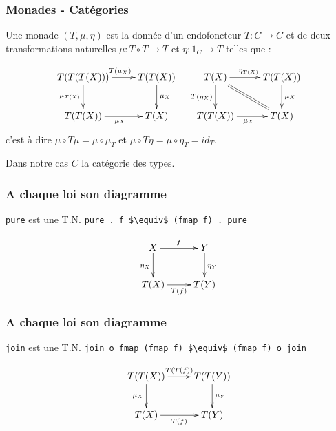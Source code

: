 \documentclass{beamer}
\begin{document}
\begin{frame}
\frametitle{Monades - Catégories}
Une monade $(T, \mu, \eta)$ est la donnée d'un
endofoncteur $T : C \rightarrow C$ et de deux
transformations naturelles $\mu : T\circ T \rightarrow T$ et $\eta : 1_C \rightarrow T$ telles que :

\[
\begin{array}{cc}
\xymatrix{
T(T(T(X))) \ar[r]^{T(\mu_X)} \ar[d]_{\mu_{T(X)}} & T(T(X)) \ar[d]^{\mu_X} \\
T(T(X)) \ar[r]_{\mu_X} & T(X) \\
}
&
\xymatrix{
T(X) \ar[r]^{\eta_{T(X)}} \ar[d]_{T(\eta_X)}  \ar@{=}[dr] & T(T(X)) \ar[d]^{\mu_X} \\
T(T(X)) \ar[r]_{\mu_X} & T(X) \\
}
\end{array}
\]
c'est à dire
$\mu \circ T\mu = \mu \circ \mu_T$
et
$\mu \circ T \eta = \mu \circ \eta_T = id_T$.

\pause
\medskip\medskip
Dans notre cas $C$ la catégorie des types.
\end{frame}

\begin{frame}
\frametitle{A chaque loi son diagramme}
\begin{alertblock}{\verb!pure! est une T.N.}
\verb!pure . f $\equiv$ (fmap f) . pure!
\end{alertblock}

\begin{block}{}
\[
\xymatrix{
X \ar[r]^{f} \ar[d]_{\eta_X} & Y \ar[d]^{\eta_Y} \\
T(X) \ar[r]_{T(f)} & T(Y) \\
}
\]
\end{block}

\end{frame}

\begin{frame}
\frametitle{A chaque loi son diagramme}
\begin{alertblock}{\verb!join! est une T.N.}
\verb!join o fmap (fmap f) $\equiv$ (fmap f) o join!
\end{alertblock}

\begin{block}{}
\[
\xymatrix{
T(T(X)) \ar[r]^{T(T(f))} \ar[d]_{\mu_{X}} & T(T(Y)) \ar[d]^{\mu_{Y}} \\
T(X) \ar[r]_{T(f)} & T(Y) \\
}
\]
\end{block}

\end{frame}
\end{document}
